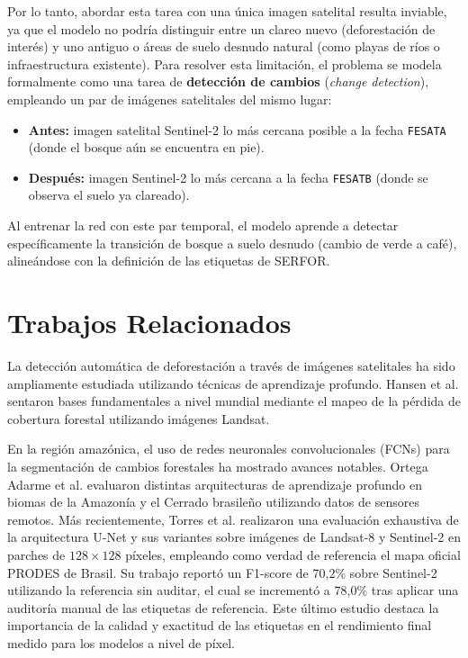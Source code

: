 \documentclass{article}
\begin{document}
Por lo tanto, abordar esta tarea con una única imagen satelital resulta inviable, ya que el modelo no podría distinguir entre un clareo nuevo (deforestación de interés) y uno antiguo o áreas de suelo desnudo natural (como playas de ríos o infraestructura existente). Para resolver esta limitación, el problema se modela formalmente como una tarea de \textbf{detección de cambios} (\textit{change detection}), empleando un par de imágenes satelitales del mismo lugar:
\begin{itemize}
    \item \textbf{Antes:} imagen satelital Sentinel-2 lo más cercana posible a la fecha \texttt{FESATA} (donde el bosque aún se encuentra en pie).
    \item \textbf{Después:} imagen Sentinel-2 lo más cercana a la fecha \texttt{FESATB} (donde se observa el suelo ya clareado).
\end{itemize}
Al entrenar la red con este par temporal, el modelo aprende a detectar específicamente la transición de bosque a suelo desnudo (cambio de verde a café), alineándose con la definición de las etiquetas de SERFOR.

\section{Trabajos Relacionados}
La detección automática de deforestación a través de imágenes satelitales ha sido ampliamente estudiada utilizando técnicas de aprendizaje profundo. Hansen et al. \cite{hansen2013high} sentaron bases fundamentales a nivel mundial mediante el mapeo de la pérdida de cobertura forestal utilizando imágenes Landsat. 

En la región amazónica, el uso de redes neuronales convolucionales (FCNs) para la segmentación de cambios forestales ha mostrado avances notables. Ortega Adarme et al. \cite{ortega2020evaluation} evaluaron distintas arquitecturas de aprendizaje profundo en biomas de la Amazonía y el Cerrado brasileño utilizando datos de sensores remotos. Más recientemente, Torres et al. \cite{torres2021deforestation} realizaron una evaluación exhaustiva de la arquitectura U-Net y sus variantes sobre imágenes de Landsat-8 y Sentinel-2 en parches de $128\times128$ píxeles, empleando como verdad de referencia el mapa oficial PRODES de Brasil. Su trabajo reportó un F1-score de 70,2\% sobre Sentinel-2 utilizando la referencia sin auditar, el cual se incrementó a 78,0\% tras aplicar una auditoría manual de las etiquetas de referencia. Este último estudio destaca la importancia de la calidad y exactitud de las etiquetas en el rendimiento final medido para los modelos a nivel de píxel.
\end{document}
